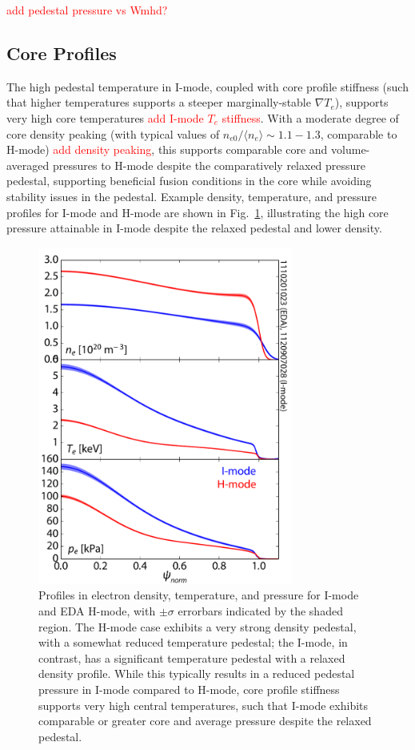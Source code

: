 \documentclass[12pt]{iopart}
\renewcommand{\note}[1]{\textcolor{red}{#1}}
\begin{document}
\note{add pedestal pressure vs Wmhd?}

\subsection{Core Profiles}\label{subsec:core}

The high pedestal temperature in I-mode, coupled with core profile stiffness (such that higher temperatures supports a steeper marginally-stable $\nabla T_e$), supports very high core temperatures \note{add I-mode $T_e$ stiffness}.
With a moderate degree of core density peaking (with typical values of $n_{e0}/\langle n_e \rangle \sim 1.1-1.3$, comparable to H-mode) \note{add density peaking}, this supports comparable core and volume-averaged pressures to H-mode despite the comparatively relaxed pressure pedestal, supporting beneficial fusion conditions in the core while avoiding stability issues in the pedestal.  Example density, temperature, and pressure profiles for I-mode and H-mode are shown in Fig.~\ref{fig:coreprof}, illustrating the high core pressure attainable in I-mode despite the relaxed pedestal and lower density.

\begin{figure}[ht]
 \centering
 \includegraphics[width=0.75\textwidth]{coreprof_v3.pdf}
 \caption{Profiles in electron density, temperature, and pressure for I-mode and EDA H-mode, with $\pm \sigma$ errorbars indicated by the shaded region.  The H-mode case exhibits a very strong density pedestal, with a somewhat reduced temperature pedestal; the I-mode, in contrast, has a significant temperature pedestal with a relaxed density profile.  While this typically results in a reduced pedestal pressure in I-mode compared to H-mode, core profile stiffness supports very high central temperatures, such that I-mode exhibits comparable or greater core and average pressure despite the relaxed pedestal.}
 \label{fig:coreprof}
\end{figure}
\end{document}
